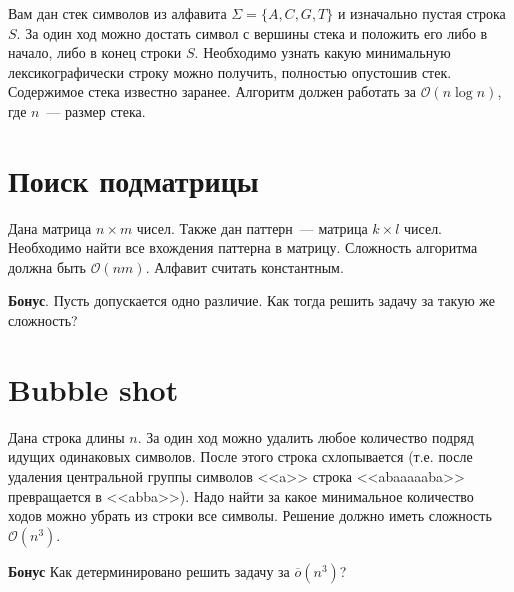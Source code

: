 \documentclass[addpoints]{exam}
\begin{document}
Вам дан стек символов из алфавита $\Sigma = \{A,C,G,T\}$ и изначально пустая строка $S$. За один ход можно достать символ с вершины стека и положить его либо в начало, либо в конец строки $S$. Необходимо узнать какую минимальную лексикографически строку можно получить, полностью опустошив стек. Содержимое стека известно заранее. Алгоритм должен работать за $\mathcal{O}(n \log{n})$, где $n$~--- размер стека.

\section{Поиск подматрицы}

Дана матрица $n \times m$ чисел. Также дан паттерн~--- матрица $k \times l$ чисел. Необходимо найти все вхождения паттерна в матрицу. Сложность алгоритма должна быть $\mathcal{O}(nm)$. Алфавит считать константным.

\textbf{Бонус}. Пусть допускается одно различие. Как тогда решить задачу за такую же сложность?

\section{Bubble shot}

Дана строка длины $n$. За один ход можно удалить любое количество подряд идущих одинаковых символов. После этого строка схлопывается (т.е. после удаления центральной группы символов <<a>> строка <<abaaaaaba>> превращается в <<abba>>). Надо найти за какое минимальное количество ходов можно убрать из строки все символы. Решение должно иметь сложность $\mathcal{O}(n^3)$.

\textbf{Бонус} Как детерминировано решить задачу за $\overline{o}(n^3)$?
\end{document}
